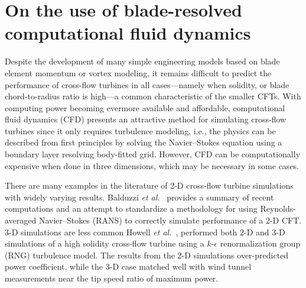 \chapter{On the use of blade-resolved computational fluid
    dynamics}\label{chap:CFD}

Despite the development of many simple engineering models based on blade element
momentum or vortex modeling, it remains difficult to predict the performance of
cross-flow turbines in all cases---namely when solidity, or blade
chord-to-radius ratio is high---a common characteristic of the smaller CFTs.
With computing power becoming evermore available and affordable, computational
fluid dynamics (CFD) presents an attractive method for simulating cross-flow
turbines since it only requires turbulence modeling, i.e., the physics can be
described from first principles by solving the Navier--Stokes equation using a
boundary layer resolving body-fitted grid. However, CFD can be computationally
expensive when done in three dimensions, which may be necessary in some cases.

There are many examples in the literature of 2-D cross-flow turbine simulations
with widely varying results. Balduzzi \emph{et al.}~\cite{Balduzzi2016} provides
a summary of recent computations and an attempt to standardize a methodology for
using Reynolds-averaged Navier--Stokes (RANS) to correctly simulate performance
of a 2-D CFT. 3-D simulations are less common  Howell \emph{et al.}~\cite{Howell2010}, performed both
2-D and 3-D simulations of a high solidity cross-flow turbine using a
$k$-$\epsilon$ renormalization group (RNG) turbulence model. The results from
the 2-D simulations over-predicted power coefficient, while the 3-D case matched
well with wind tunnel measurements near the tip speed ratio of maximum power.

